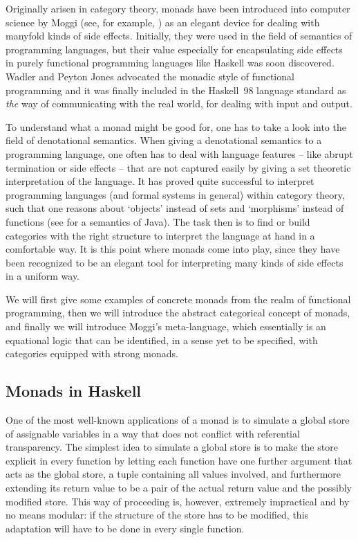 Originally arisen in category theory, monads have been introduced into computer
science by Moggi (see, for example, \cite{Moggi91}) as an elegant device for
dealing with manyfold kinds of side effects. Initially, they were used in the
field of semantics of programming languages, but their value especially for
encapsulating side effects in purely functional programming languages like
Haskell was soon discovered.  Wadler and Peyton Jones \cite{Wadler97,
  JonesWadler93} advocated the monadic style of functional programming and it
was finally included in the Haskell~98 language standard as \emph{the} way of
communicating with the real world, \IE for dealing with input and output.

To understand what a monad might be good for, one has to take a look into the
field of denotational semantics. When giving a denotational semantics to a
programming language, one often has to deal with language features -- like
abrupt termination or side effects -- that are not captured easily by giving a
set theoretic interpretation of the language. It has proved quite successful to
interpret programming languages (and formal systems in general) within category
theory, such that one reasons about `objects' instead of sets and `morphisms'
instead of functions (see \cite{JacobsPoll00} for a semantics of Java\TM). The
task then is to find or build categories with the right structure to interpret
the language at hand in a comfortable way. It is this point where monads come
into play, since they have been recognized to be an elegant tool for
interpreting many kinds of side effects in a uniform way.
 
We will first give some examples of concrete monads from the realm of functional
programming, then we will introduce the abstract categorical concept of monads,
and finally we will introduce Moggi's meta-language, which essentially is an
equational logic that can be identified, in a sense yet to be specified, with
categories equipped with strong monads.


\subsection{Monads in Haskell}
\label{sec:monads-haskell}

One of the most well-known applications of a monad is to simulate a global store
of assignable variables in a way that does not conflict with referential
transparency. The simplest idea to simulate a global store is to make the store
explicit in every function by letting each function have one further argument
that acts as the global store, \EG a tuple containing all values involved, and
furthermore extending its return value to be a pair of the actual return value and
the possibly modified store. This way of proceeding is, however, extremely
impractical and by no means modular: if the structure of the store has to be
modified, this adaptation will have to be done in every single function. 

